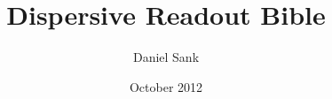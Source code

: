 \documentclass[aps,prl,twocolumn]{revtex4}
\begin{document}
\title{Dispersive Readout Bible}

\author{Daniel Sank} 

\date{October 2012}

\maketitle





\end{document}
